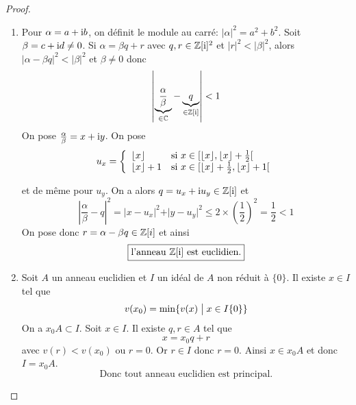 \documentclass[12pt]{article}
\begin{document}
\begin{proof}
	\phantom{}
	\begin{enumerate}
		\item Pour $\alpha=a+\mathrm{i} b$, on définit le module au carré: $\vert\alpha\vert^{2}=a^{2}+b^{2}$. Soit $\beta=c+\mathrm{i} d\neq0$. Si $\alpha=\beta q+r$ avec $q,r\in\mathbb{Z}[\mathrm{i}]^{2}$ et $\vert r\vert^{2}<\vert \beta\vert^{2}$, alors $\vert\alpha-\beta q\vert^{2}<\vert\beta\vert^{2}$ et $\beta\neq0$ donc
		\begin{equation}
			\left\vert\underbrace{\frac{\alpha}{\beta}}_{\in\mathbb{C}}-\underbrace{q}_{\in\mathbb{Z}[\mathrm{i}]}\right\vert< 1
		\end{equation}
		On pose $\frac{\alpha}{\beta}=x+\mathrm{i} y$. On pose 
		\begin{equation}
			u_{x}=
			\left\{
				\begin{array}[]{ll}
					\lfloor x\rfloor & \text{si }x\in[\lfloor x\rfloor,\lfloor x\rfloor+\frac{1}{2}[\\
					\lfloor x\rfloor+1 & \text{si }x\in[\lfloor x\rfloor+\frac{1}{2},\lfloor x\rfloor+1[
				\end{array}
			\right.
		\end{equation}

		et de même pour $u_{y}$. On a alors $q=u_{x}+\mathrm{i} u_{y}\in\mathbb{Z}[\mathrm{i}]$ et 
		\begin{equation}
			\left\vert\frac{\alpha}{\beta}-q\right\vert^{2}=\vert x-u_{x}\vert^{2}+\vert y-u_{y}\vert^{2}\leqslant2\times \left(\frac{1}{2}\right)^{2}=\frac{1}{2}<1
		\end{equation}
		On pose donc $r=\alpha-\beta q\in\mathbb{Z}[i]$ et ainsi 
		\begin{equation}
			\boxed{\text{l'anneau }\mathbb{Z}[\mathrm{i}]\text{ est euclidien.}}
		\end{equation}

		\item Soit $A$ un anneau euclidien et $I$ un idéal de $A$ non réduit à $\{0\}$. Il existe $x\in I$ tel que 
		\begin{equation}
			v(x_{0})=\min\{v(x)\bigm| x\in I\{0\}\}
		\end{equation}
		On a $x_{0}A\subset I$. Soit $x\in I$. Il existe $q,r\in A$ tel que 
		\begin{equation}
			x=x_{0}q+r
		\end{equation}
		avec $v(r)<v(x_{0})$ ou $r=0$. Or $r\in I$ donc $r=0$. Ainsi $x\in x_{0}A$ et donc $I=x_{0}A$. 
		\begin{equation}
			\boxed{\text{Donc tout anneau euclidien est principal.}}
		\end{equation}
	\end{enumerate}
\end{proof}
\end{document}

